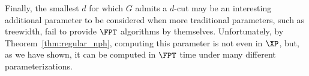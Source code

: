 Finally, the smallest $d$ for which $G$ admits a $d$-cut may be an interesting additional parameter to be considered when more traditional parameters, such as treewidth, fail to provide $\FPT$ algorithms by themselves.
Unfortunately, by Theorem~\ref{thm:regular_nph}, computing this parameter is not even in $\XP$, but, as we have shown, it can be computed in $\FPT$ time under many different parameterizations. 